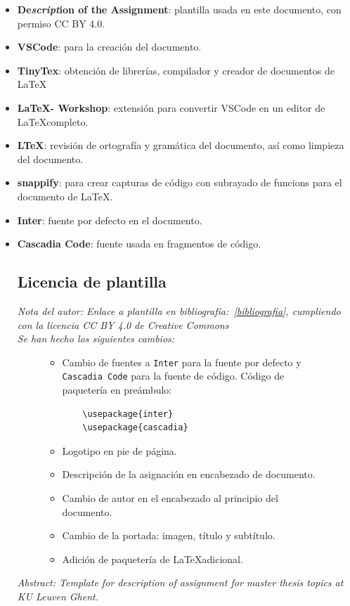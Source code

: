 \documentclass[11pt]{article}
\begin{document}
            \begin{itemize}                
                \item \textbf{De\textit{script}ion of the Assignment}: \cite{template} plantilla usada en este documento, con permiso CC BY 4.0.
                \item \textbf{VSCode}: \cite{vscode} para la creación del documento.
                \item \textbf{TinyTex}: \cite{tinytex} obtención de librerías, compilador y creador de documentos de \LaTeX
                \item \textbf{\LaTeX - Workshop}: \cite{workshop} extensión para convertir VSCode en un editor de \LaTeX completo.
                \item \textbf{LTeX}: \cite{ltex} revisión de ortografía y gramática del documento, así como limpieza del documento.
                \item \textbf{snappify}: \cite{seriouscode-gmbh-2022} para crear capturas de código con subrayado de funcions para el documento de \LaTeX.

                \item \textbf{Inter}: \cite{inter} fuente por defecto en el documento. 
                \item \textbf{Cascadia Code}: \cite{cascadia} fuente usada en fragmentos de código.

    \newpage
    \subsection{Licencia de plantilla}
        \textit{Nota del autor: Enlace a plantilla en bibliografía:~\ref{bibliografia}, cumpliendo con la licencia CC BY 4.0 de Creative Commons}\\
        \textit{Se han hecho los siguientes cambios:}
        \begin{figure}[H]
            \begin{itemize}
                \item Cambio de fuentes a \texttt{Inter} para la fuente por defecto y \texttt{Cascadia Code} para la fuente de código.
                Código de paquetería en preámbulo:
\begin{verbatim}
    \usepackage{inter}
    \usepackage{cascadia}
\end{verbatim}
                \item Logotipo en pie de página.
                \item Descripción de la asignación en encabezado de documento.
                \item Cambio de autor en el encabezado al principio del documento.
                \item Cambio de la portada: imagen, título y subtítulo.
                \item Adición de paquetería de \LaTeX adicional. 
            \end{itemize}
        \end{figure}
        \textit{Abstract: Template for de\textit{script}ion of assignment for master thesis topics at KU Leuven Ghent.}
        \end{itemize}
\end{document}

